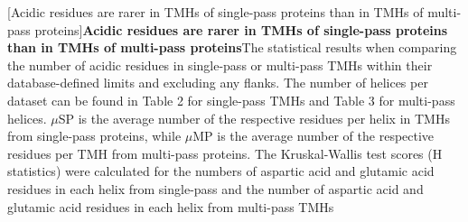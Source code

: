 \begin{table}[htbp]

  \label{table:acidicresiduesarerare}
  \centering
  [Acidic residues are rarer in TMHs of single-pass proteins than in TMHs of multi-pass proteins]{\textbf{Acidic residues are rarer in TMHs of single-pass proteins than in TMHs of multi-pass proteins}The statistical results when comparing the number of acidic residues in single-pass or multi-pass TMHs within their database-defined limits and excluding any flanks. The number of helices per dataset can be found in Table 2 for single-pass TMHs and Table 3 for multi-pass helices. $\mu$SP is the average number of the respective residues per helix in TMHs from single-pass proteins, while $\mu$MP is the average number of the respective residues per TMH from multi-pass proteins. The Kruskal-Wallis test scores (H statistics) were calculated for the numbers of aspartic acid and glutamic acid residues in each helix from single-pass and the number of aspartic acid and glutamic acid residues in each helix from multi-pass TMHs}

\end{table}
